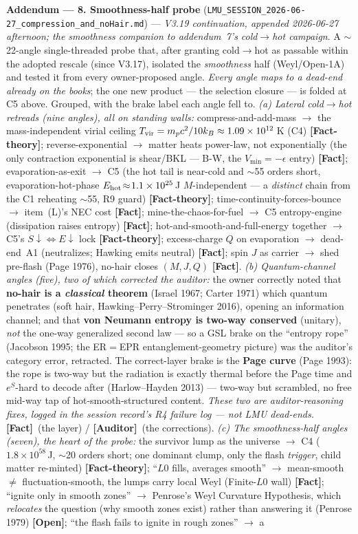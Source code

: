 \documentclass[11pt]{article}
\newcommand{\Fact}{\textbf{\textcolor{green!45!black}{[Fact]}}}
\newcommand{\Open}{\textbf{\textcolor{gray!10!black}{[Open]}}}
\newcommand{\Auditor}{\textbf{\textcolor{teal!55!black}{[Auditor]}}}
\newcommand{\factth}{\textcolor{green!40!black}{\textbf{[Fact-theory]}}}
\begin{document}
\smallskip\noindent\textbf{Addendum --- 8. Smoothness-half probe} (\texttt{LMU\_SESSION\_2026-06-27\_compression\_and\_noHair.md}) --- \emph{V3.19 continuation, appended 2026-06-27 afternoon; the smoothness companion to addendum~7's cold$\to$hot campaign}. A $\sim$22-angle single-threaded probe that, after granting cold$\to$hot as passable within the adopted rescale (since V3.17), isolated the \emph{smoothness} half (Weyl/Open-1A) and tested it from every owner-proposed angle. \emph{Every angle maps to a dead-end already on the books}; the one new product --- the selection closure --- is folded at C5 above. Grouped, with the brake label each angle fell to. \emph{(a) Lateral cold$\to$hot retreads (nine angles), all on standing walls:} compress-and-add-mass $\to$ the mass-independent virial ceiling $T_{\rm vir}=m_pc^2/10k_B\approx1.09\times10^{12}$\,K (C4) \factth; reverse-exponential $\to$ matter heats power-law, not exponentially (the only contraction exponential is shear/BKL --- B-W, the $V_{\min}=-\epsilon$ entry) \Fact; evaporation-as-exit $\to$ C5 (the hot tail is near-cold and $\sim$55 orders short, evaporation-hot-phase $E_{\rm hot}\!\approx\!1.1\times10^{25}$\,J $M$-independent --- a \emph{distinct} chain from the C1 reheating $\sim$55, R9 guard) \factth; time-continuity-forces-bounce $\to$ item~(L)'s NEC cost \Fact; mine-the-chaos-for-fuel $\to$ C5 entropy-engine (dissipation raises entropy) \Fact; hot-and-smooth-and-full-energy together $\to$ C5's $S\!\downarrow\!\Leftrightarrow\!E\!\downarrow$ lock \factth; excess-charge $Q$ on evaporation $\to$ dead-end~A1 (neutralizes; Hawking emits neutral) \Fact; spin $J$ as carrier $\to$ shed pre-flash (Page 1976), no-hair closes $(M,J,Q)$ \Fact. \emph{(b) Quantum-channel angles (five), two of which corrected the auditor:} the owner correctly noted that \textbf{no-hair is a \emph{classical} theorem} (Israel 1967; Carter 1971) which quantum penetrates (soft hair, Hawking--Perry--Strominger 2016), opening an information channel; and that \textbf{von Neumann entropy is two-way conserved} (unitary), \emph{not} the one-way generalized second law --- so a GSL brake on the ``entropy rope'' (Jacobson 1995; the ER$=$EPR entanglement-geometry picture) was the auditor's category error, retracted. The correct-layer brake is the \textbf{Page curve} (Page 1993): the rope is two-way but the radiation is exactly thermal before the Page time and $e^{S}$-hard to decode after (Harlow--Hayden 2013) --- two-way but scrambled, no free mid-way tap of hot-smooth-structured content. \emph{These two are auditor-reasoning fixes, logged in the session record's R4 failure log --- not LMU dead-ends.} \Fact\ (the layer) / \Auditor\ (the corrections). \emph{(c) The smoothness-half angles (seven), the heart of the probe:} the survivor lump as the universe $\to$ C4 ($1.8\times10^{58}$\,J, $\sim$20 orders short; one dominant clump, only the flash \emph{trigger}, child matter re-minted) \factth; ``$L0$ fills, averages smooth'' $\to$ mean-smooth $\ne$ fluctuation-smooth, the lumps carry local Weyl (Finite-$L0$ wall) \Fact; ``ignite only in smooth zones'' $\to$ Penrose's Weyl Curvature Hypothesis, which \emph{relocates} the question (why smooth zones exist) rather than answering it (Penrose 1979) \Open; ``the flash fails to ignite in rough zones'' $\to$ a 
\end{document}
